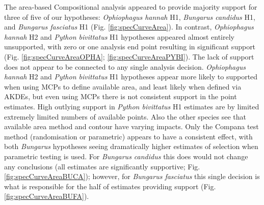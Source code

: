 \documentclass[10pt,a4paper]{article}
\begin{document}
The area-based Compositional analysis appeared to provide majority support for three of five of our hypotheses: \emph{Ophiophagus hannah} H1, \emph{Bungarus candidus} H1, and \emph{Bungarus fasciatus} H1 (Fig. \ref{fig:specCurveArea}).
In contrast, \emph{Ophiophagus hannah} H2 and \emph{Python bivittatus} H1 hypotheses appeared almost entirely unsupported, with zero or one analysis end point resulting in significant support (Fig. \ref{fig:specCurveAreaOPHA}; \ref{fig:specCurveAreaPYBI}).
The lack of support does not appear to be connected to any single analysis decision.
\emph{Ophiophagus hannah} H2 and \emph{Python bivittatus} H1 hypotheses appear more likely to supported when using MCPs to define available area, and least likely when defined via AKDEs, but even using MCPs there is not consistent support in the point estimates.
High outlying support in \emph{Python bivittatus} H1 estimates are by limited extremely limited numbers of available points.
Also the other species see that available area method and contour have varying impacts.
Only the Compana test method (randomisation or parametric) appears to have a consistent effect, with both \emph{Bungarus} hypotheses seeing dramatically higher estimates of selection when parametric testing is used.
For \emph{Bungarus candidus} this does would not change any conclusions (all estimates are significantly supportive; Fig. \ref{fig:specCurveAreaBUCA}); however, for \emph{Bungarus fasciatus} this single decision is what is responsible for the half of estimates providing support (Fig. \ref{fig:specCurveAreaBUFA}).
\end{document}
